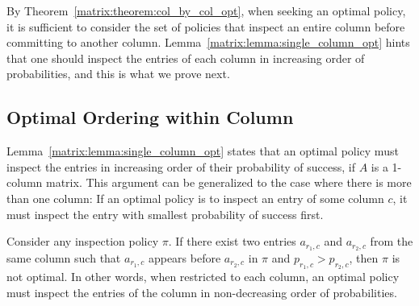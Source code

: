  By Theorem~\ref{matrix:theorem:col_by_col_opt}, when seeking an optimal policy, it is sufficient to consider the set of policies that inspect an entire column before committing to another column. Lemma~\ref{matrix:lemma:single_column_opt} hints that one should inspect the entries of each column in increasing order of probabilities, and this is what we prove next.


 \subsection{Optimal Ordering within Column} 

 Lemma~\ref{matrix:lemma:single_column_opt} states that
 an optimal policy must inspect the entries in increasing order of their probability of success, if $A$ is a 1-column matrix.
 This argument can be generalized to the case where there is more than one column: If an optimal policy is to inspect an entry of some column $c$, it must inspect the entry with smallest probability of success first. 
 \begin{theorem} \label{matrix:theorem:within_column_opt}
 	Consider any inspection policy $\pi$.
 	If there exist two entries $a_{r_1,c}$ and $a_{r_2,c}$ from the same column such that $a_{r_1,c}$ appears before $a_{r_2,c}$ in $\pi$ and $p_{r_1,c} > p_{r_2,c}$, then $\pi$ is not optimal. 
 	In other words, when restricted to each column, an optimal policy must inspect the entries of the column in non-decreasing order of probabilities.
 \end{theorem}
